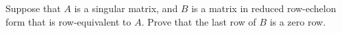 Suppose that $A$ is a singular matrix, and $B$ is a matrix in reduced row-echelon form that is row-equivalent to $A$.  Prove that the last row of $B$ is a zero row.